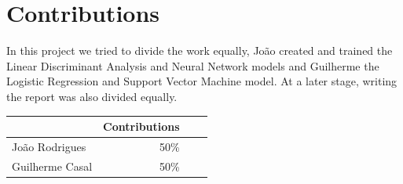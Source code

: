 \documentclass[12pt,a4paper,twocolumn]{article}
\begin{document}
\section{Contributions}
In this project we tried to divide the work equally, João created and trained the Linear Discriminant Analysis and Neural Network models and Guilherme the Logistic Regression and Support Vector Machine model. At a later stage, writing the report was also divided equally.

\begin{table}[h!]
\begin{tabular}{lrrr}
\toprule
{} &       Contributions \\
\midrule
João Rodrigues	& 50\% \\
Guilherme Casal & 50\% \\
\bottomrule
\end{tabular}
    
\end{table}


\nocite{Paper5,Paper1,Paper3,sklearn,mastromichalakis2021alrelu,misc_breast_cancer,Paper4,tensorflow,roc} 
\printbibliography







\end{document}
